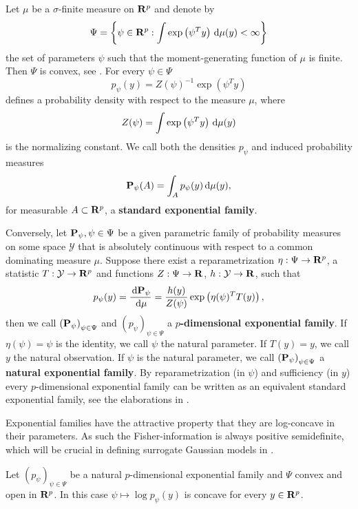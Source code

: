 \begin{definition}
    Let $\mu$ be a $\sigma$-finite measure on $\R^{p}$ and denote by 
    $$\Psi = \left\{\psi \in \R^{p} : \int \exp \left( \psi^{T} y \right) \d\mu(y) < \infty\right\}$$
    the set of parameters $\psi$ such that the moment-generating function of $\mu$ is finite. Then $\Psi$ is convex, see \citep[Theorem 1.13]{Brown1986Fundamentals}.
    For every $\psi \in \Psi$ $$p_{\psi}(y) = Z(\psi)^{-1} \exp (\psi^{T} y)$$ defines a probability density with respect to the measure $\mu$, where $$Z(\psi) = \int \exp \left( \psi^{T} y \right) \d\mu(y)$$ is the normalizing constant. 
    We call both the densities $p_{\psi}$ and induced probability measures $$ \P_{\psi} (A) = \int_{A} p_{\psi}(y) \d \mu(y),$$ for measurable $A \subset \R^{p}$, a \textbf{standard exponential family}.

    Conversely, let $\P_{\psi}, \psi \in \Psi$ be a given parametric family of probability measures on some space $\mathcal Y$ that is absolutely continuous with respect to a common dominating measure $\mu$. Suppose there exist a reparametrization $\eta : \Psi \to \R^{p}$, a statistic $T: \mathcal Y \to \R^{p}$ and functions $Z: \Psi\to \R$, $h:\mathcal Y \to \R$, such that
    $$
        p_{\psi}(y) = \frac{\d \P_{\psi}}{\d \mu} = \frac{h(y)}{Z(\psi) } \exp \left(\eta(\psi)^{T}T(y)\right),
    $$
    then we call $\left(\P_{\psi}\right)_{\psi \in \Psi} $ and $\left(p_{\psi}\right)_{ \psi \in \Psi}$ a \textbf{$p$-dimensional exponential family}. If $\eta(\psi) = \psi$ is the identity, we call $\psi$ the natural parameter. If $T(y) = y$, we call $y$ the natural observation. If $\psi$ is the natural parameter, we call $\left( \P_{\psi} \right)_{\psi \in \Psi}$ a \textbf{natural exponential family}. By reparametrization (in $\psi$) and sufficiency (in $y$) every $p$-dimensional exponential family can be written as an equivalent standard exponential family, see the elaborations in \citep[Chapter 1]{Brown1986Fundamentals}. 
\end{definition}

Exponential families have the attractive property that they are log-concave in their parameters. As such the Fisher-information is always positive semidefinite, which will be crucial in defining surrogate Gaussian models in .
\begin{lemma}
    \label{lem:log-concavity}
    Let $\left(p_{\psi}\right)_{\psi \in \Psi}$ be a natural $p$-dimensional exponential family and $\Psi$ convex and open in $\R^{p}$. In this case $\psi \mapsto \log p_{\psi}(y)$ is concave for every $y \in \R^{p}$.
\end{lemma}

